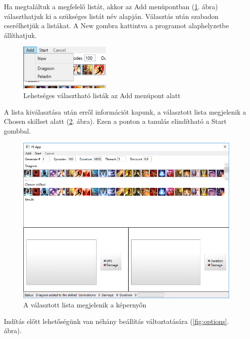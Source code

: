 \documentclass[12pt]{article}
\begin{document}
	Ha megtaláltuk a megfelelő listát, akkor az Add menüpontban (\ref{fig:addmenu}. ábra) választhatjuk ki a szükséges listát név alapján. Választás után szabadon cserélhetjük a listákat. A New gombra kattintva a programot alaphelyzetbe állíthatjuk.
	
	\begin{figure}[H]
		\begin{center}
			\includegraphics[width=0.4\textwidth]{addmenu}
		\end{center}
		\caption{Lehetséges választható listák az Add menüpont alatt}
		\label{fig:addmenu}
	\end{figure}
	
	A lista kiválasztása után erről információt kapunk, a választott lista megjelenik a Chosen skillset alatt (\ref{fig:chosen}. ábra). Ezen a ponton a tanulás elindítható a Start gombbal.
	
	\begin{figure}[H]
		\begin{center}
			\includegraphics[width=1\textwidth]{chosen}
		\end{center}
		\caption{A választott lista megjelenik a képernyőn}
		\label{fig:chosen}
	\end{figure}
	
	Indítás előtt lehetőségünk van néhány beállítás változtatására (\ref{fig:options}. ábra).
	
\end{document}
